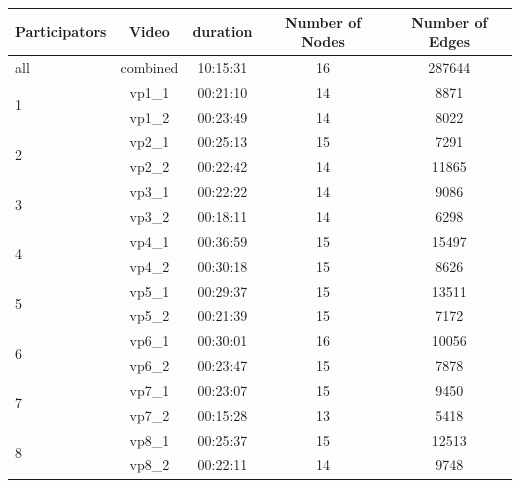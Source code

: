 \clearpage


\begin{longtable}{lcccc}
        \toprule
    Participators        & Video    & \multicolumn{1}{l}{duration} & Number of Nodes& Number of Edges\\
        \midrule
    all                 & combined & 10:15:31                     & 16    &287644  \\
        \midrule
    \multirow{2}{*}{1}  & vp1\_1   & 00:21:10                     & 14    &8871     \\
                        & vp1\_2   & 00:23:49                     & 14    &8022          \\
        \midrule
    \multirow{2}{*}{2}  & vp2\_1   & 00:25:13                     & 15    &7291          \\
                        & vp2\_2   & 00:22:42                     & 14    &11865          \\
        \midrule
    \multirow{2}{*}{3}  & vp3\_1   & 00:22:22                     & 14    &9086          \\
                        & vp3\_2   & 00:18:11                     & 14    &6298          \\
        \midrule
    \multirow{2}{*}{4}  & vp4\_1   & 00:36:59                     & 15    &15497          \\
                        & vp4\_2   & 00:30:18                     & 15    &8626          \\
        \midrule
    \multirow{2}{*}{5}  & vp5\_1   & 00:29:37                     & 15    &13511          \\
                        & vp5\_2   & 00:21:39                     & 15    &7172          \\
        \midrule
    \multirow{2}{*}{6}  & vp6\_1   & 00:30:01                     & 16    &10056          \\
                        & vp6\_2   & 00:23:47                     & 15    &7878          \\
        \midrule
    \multirow{2}{*}{7}  & vp7\_1   & 00:23:07                     & 15    &9450          \\
                        & vp7\_2   & 00:15:28                     & 13    &5418          \\
        \midrule
    \multirow{2}{*}{8}  & vp8\_1   & 00:25:37                     & 15    &12513          \\
                        & vp8\_2   & 00:22:11                     & 14    &9748          \\

\end{longtable}

